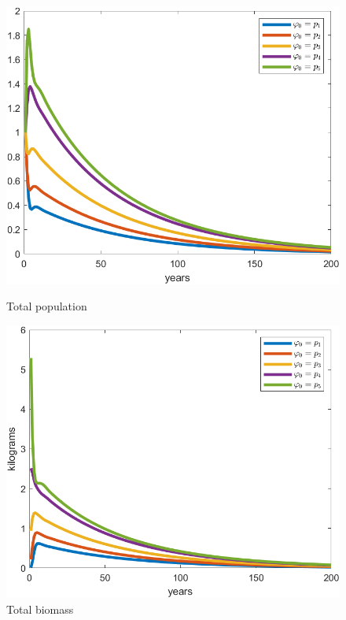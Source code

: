 \begin{figure}[H]
	\centering
	\begin{minipage}{.43\textwidth}
	\includegraphics[width=\linewidth]{Images/F=0.05/total_pop_when_f=0.05}
	\caption{Total population}
	\label{fig:totalpopwhenf=0.05}
	\end{minipage} \quad 
	\centering
	\begin{minipage}{.43\textwidth}
	\includegraphics[width=\linewidth]{Images/F=0.05/total_biomass_when_f=0.05}
	\caption{Total biomass}
	\label{fig:totalbiomasswhenf=0.05}
	\end{minipage}
\end{figure}

